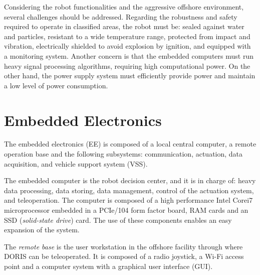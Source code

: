 \documentclass{ifacconf}
\begin{document}
Considering the robot functionalities and the aggressive offshore environment,
several challenges should be addressed. Regarding the robustness and safety
required to operate in classified areas, the robot must be: sealed against
water and particles, resistant to a wide temperature range, protected from
impact and vibration, electrically shielded to avoid explosion by ignition, and
equipped with a monitoring system. Another concern is that the embedded
computers must run heavy signal processing algorithms, requiring high computational power. On the other hand,
the power supply system must efficiently provide power and maintain a low level of
power consumption.



\section{Embedded Electronics}\label{sec:electronics_overview}
The embedded electronics (EE) is composed of a local central computer,
a remote operation base and the following subsystems: communication, actuation,
data acquisition, and vehicle support system (VSS).

The embedded computer is the robot decision center, and it is in charge
of:
heavy data processing, data
storing, data management, control of the actuation system, and teleoperation.
The computer is composed of a high performance Intel\textregistered
Core\texttrademark i7 microprocessor embedded in a PCIe/104 form factor board,
RAM cards and an SSD (\emph{solid-state drive}) card. The use of these
components enables an easy expansion of the system.

The \emph{remote base} is the user workstation in the offshore facility
through where DORIS can be teleoperated. It is composed of a radio
joystick, a Wi-Fi access point and a computer system with a graphical user
interface (GUI).
\end{document}
